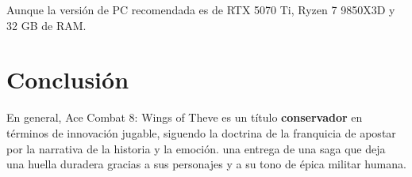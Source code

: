 \documentclass{article}
\begin{document}
Aunque la versión de PC recomendada es de RTX 5070 Ti, Ryzen 7 9850X3D y 32 GB de RAM.
 
\section{Conclusión}
En general, Ace Combat 8: Wings of Theve es un título \textbf{conservador} en términos de innovación jugable, siguendo la doctrina de la franquicia de apostar por la narrativa de la historia y la emoción. una entrega de una saga que deja una huella duradera gracias a sus personajes y a su tono de épica militar humana.
 
\end{document}
